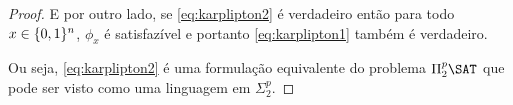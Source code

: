 \begin{proof}
E por outro lado, se \ref{eq:karplipton2} é verdadeiro então para todo $x \in \{0, 1\}^{n}$, $\phi_{x}$ é satisfazível e portanto \ref{eq:karplipton1} também é verdadeiro.

Ou seja, \ref{eq:karplipton2} é uma formulação equivalente do problema $\Pi_{2}^{p}\SAT$ que pode ser visto como uma linguagem em $\Sigma_{2}^{p}$.








\end{proof}

